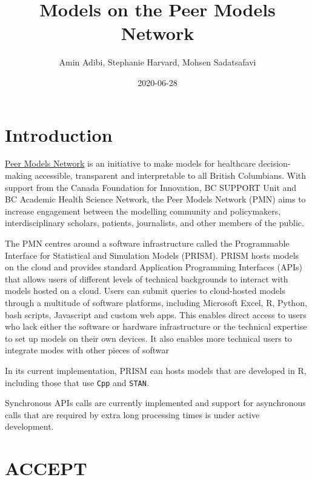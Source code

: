 \documentclass[
]{book}
\title{Models on the Peer Models Network}
\author{Amin Adibi, Stephanie Harvard, Mohsen Sadatsafavi}
\date{2020-06-28}
\begin{document}
\maketitle

{
\setcounter{tocdepth}{1}
\tableofcontents
}
\hypertarget{introduction}{%
\chapter{Introduction}\label{introduction}}

\href{https://www.peermodelsnetwork.com/}{Peer Models Network} is an initiative to make models for healthcare decision-making accessible, transparent and interpretable to all British Columbians. With support from the Canada Foundation for Innovation, BC SUPPORT Unit and BC Academic Health Science Network, the Peer Models Network (PMN) aims to increase engagement between the modelling community and policymakers, interdisciplinary scholars, patients, journalists, and other members of the public.

The PMN centres around a software infrastructure called the Programmable Interface for Statistical and Simulation Models (PRISM). PRISM hosts models on the cloud and provides standard Application Programming Interfaces (APIs) that allows users of different levels of technical backgrounds to interact with models hosted on a cloud. Users can submit queries to cloud-hosted models through a multitude of software platforms, including Microsoft Excel, R, Python, bash scripts, Javascript and custom web apps. This enables direct access to users who lack either the software or hardware infrastructure or the technical expertise to set up models on their own devices. It also enables more technical users to integrate modes with other pieces of softwar

In its current implementation, PRISM can hosts models that are developed in R, including those that use \texttt{Cpp} and \texttt{STAN}.

Synchronous APIs calls are currently implemented and support for asynchronous calls that are required by extra long processing times is under active development.

\hypertarget{accept}{%
\chapter{ACCEPT}\label{accept}}
\end{document}
